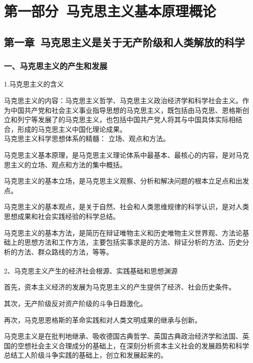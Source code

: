 \documentclass{ctexart}
\begin{document}
\tableofcontents


\section{第一部分\ 马克思主义基本原理概论}

\subsection{第一章\ 马克思主义是关于无产阶级和人类解放的科学}
\subsubsection{一、马克思主义的产生和发展}

1.马克思主义的含义

马克思主义的内容：马克思主义哲学、马克思主义政治经济学和科学社会主义。作为中国共产党和社会主义事业指导思想的马克思主义，既包括由马克思、恩格斯创立和列宁等发展了的马克思主义，也包括中国共产党人将其与中国具体实际相结合，形成的马克思主义中国化理论成果。
\\

马克思主义科学思想体系的精髓： 立场、观点和方法。

马克思主义基本原理，是马克思主义理论体系中最基本、最核心的内容，是对马克思主义的立场、观点和方法的集中概括。

马克思主义的基本立场，是马克思主义观察、分析和解决问题的根本立足点和出发点。

马克思主义的基本观点，是关于自然、社会和人类思维规律的科学认识，是对人类思想成果和社会实践经验的科学总结。

马克思主义的基本方法，是简历在辩证唯物主义和历史唯物主义世界观、方法论基础上的思想方法和工作方法，主要包括实事求是的方法、辩证分析的方法、历史分析的方法、群众路线的方法，等等。
\\\\

2、马克思主义产生的经济社会根源、实践基础和思想渊源

首先，资本主义经济的发展为马克思主义的产生提供了经济、社会历史条件。

其次，无产阶级反对资产阶级的斗争日趋激化。

再次，马克思恩格斯的革命实践和对人类文明成果的继承与创新。

马克思主义是在批判地继承、吸收德国古典哲学、英国古典政治经济学和法国、英国的空想社会主义合理成分的基础上，在深刻分析资本主义社会的发展趋势和科学总结工人阶级斗争实践的基础上，创立和发展起来的。
\\\\
\end{document}
